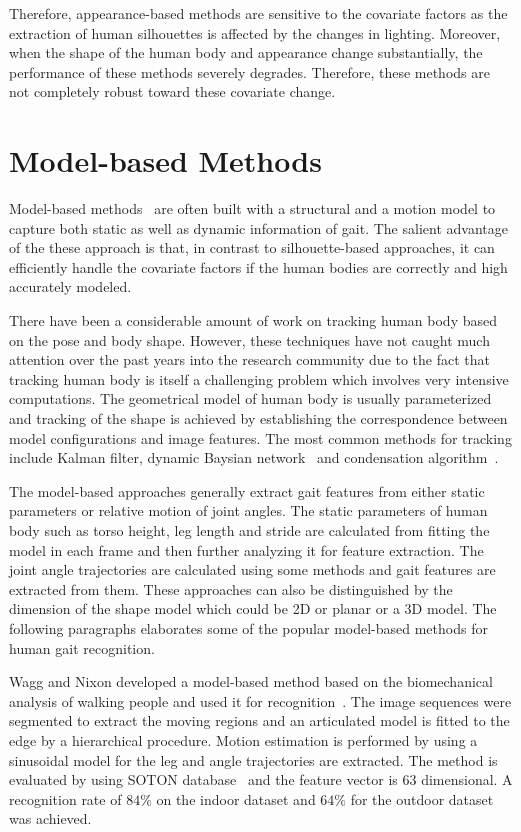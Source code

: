 Therefore, appearance-based methods are sensitive to the covariate factors as the extraction of human silhouettes is affected by the changes in lighting. Moreover, when the shape of the human body and appearance change substantially, the performance of these methods severely degrades. Therefore, these methods are not completely robust toward these covariate change.



\section{Model-based Methods} \label{sec:model_based_methods}
Model-based methods~\cite{Yam_04, Gu_10, Wagg_04} are often built with a structural and a motion model to capture both static as well as dynamic information of gait. The salient advantage of the these approach is that, in contrast to silhouette-based approaches, it can efficiently handle the covariate factors if the human bodies are correctly and high accurately modeled.

There have been a considerable amount of work on tracking human body based on the pose and body shape. However, these techniques have not caught much attention over the past years into the research community due to the fact that tracking human body is itself a challenging problem which involves very intensive computations. The geometrical model of human body is usually parameterized and tracking of the shape is achieved by establishing the correspondence between model configurations and image features. The most common methods for tracking include Kalman filter, dynamic Baysian network~\cite{Pavlovic_99} and condensation algorithm~\cite{Isard_98}. 

The model-based approaches generally extract gait features from either static parameters or relative motion of joint angles. The static parameters of human body such as torso height, leg length and stride are calculated from fitting the model in each frame and then further analyzing it for feature extraction. The joint angle trajectories are calculated using some methods and gait features are extracted from them. These approaches can also be distinguished by the dimension of the shape model which could be 2D or planar or a 3D model. The following paragraphs elaborates some of the popular model-based methods for human gait recognition.


Wagg and Nixon developed a model-based method based on the biomechanical analysis of walking people and used it for recognition~\cite{Wagg_04}. The image sequences were segmented to extract the moving regions and an articulated model is fitted to the edge by a hierarchical procedure. Motion estimation is performed by using a sinusoidal model for the leg and angle trajectories are extracted. The method is evaluated by using SOTON database~\cite{Shutler_04} and the feature vector is $63$ dimensional. A recognition rate of $84\%$ on the indoor dataset and $64\%$ for the outdoor dataset was achieved.


